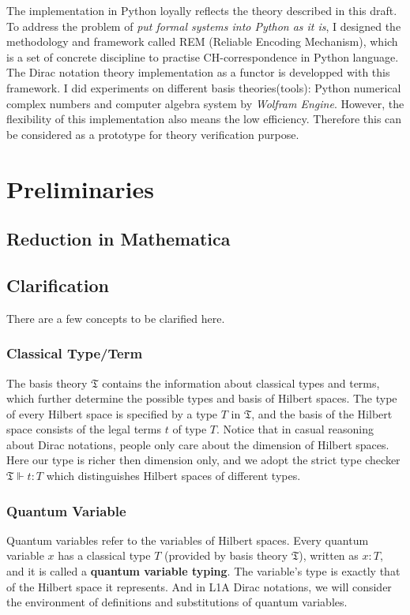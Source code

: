 \documentclass{article}
\begin{document}
The implementation in Python loyally reflects the theory described in this draft. To address the problem of \textit{put formal systems into Python as it is}, I designed the methodology and framework called REM (Reliable Encoding Mechanism), which is a set of concrete discipline to practise CH-correspondence in Python language. The Dirac notation theory implementation as a functor is developped with this framework. I did experiments on different basis theories(tools): Python numerical complex numbers and computer algebra system by \textit{Wolfram Engine}.
However, the flexibility of this implementation also means the low efficiency. Therefore this can be considered as a prototype for theory verification purpose.

\clearpage

\tableofcontents

\clearpage

\section{Preliminaries}

\subsection{Reduction in Mathematica}

\subsection{Clarification}
There are a few concepts to be clarified here.

\subsubsection*{Classical Type/Term}
The basis theory $\mathfrak{T}$ contains the information about classical types and terms, which further determine the possible types and basis of Hilbert spaces. The type of every Hilbert space is specified by a type $T$ in $\mathfrak{T}$, and the basis of the Hilbert space consists of the legal terms $t$ of type $T$. Notice that in casual reasoning about Dirac notations, people only care about the dimension of Hilbert spaces. Here our type is richer then dimension only, and we adopt the strict type checker $\mathfrak{T} \Vdash t : T$ which distinguishes Hilbert spaces of different types.


\subsubsection*{Quantum Variable}
Quantum variables refer to the variables of Hilbert spaces. Every quantum variable $x$ has a classical type $T$ (provided by basis theory $\mathfrak{T}$), written as $x : T$, and it is called a \textbf{quantum variable typing}. The variable's type is exactly that of the Hilbert space it represents. And in L1A Dirac notations, we will consider the environment of definitions and substitutions of quantum variables.
\end{document}
